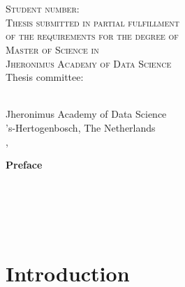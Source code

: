\documentclass[10pt, twoside, letterpaper]{report}
\begin{document}
\begin{titlepage}
\begin{center}
    \huge{\textbf{\longtitle}}\\[1.2cm]

    \normalsize{\fullname}\\
    \normalsize{\textsc{Student number}: \studentnumber}\\[1cm]

    \normalsize{\textsc{Thesis submitted in partial fulfillment}}\\
    \normalsize{\textsc{of the requirements for the degree of}}\\
    \normalsize{\textsc{Master of Science in \programme}}\\
    \normalsize{\textsc{Jheronimus Academy of Data Science}}\\[1.5cm]
    
    \normalsize{Thesis committee:}\\[0.2cm]
    \normalsize{\firstsupervisor}\\
    \normalsize{\secondsupervisor}

    \vfill

    \normalsize{Jheronimus Academy of Data Science}\\
    \normalsize{'s-Hertogenbosch, The Netherlands}\\
    \normalsize{\finalmonth, \finalyear}
\end{center}
\end{titlepage}
\newpage\thispagestyle{empty}\strut\newpage\thispagestyle{empty}

\textbf{Preface}



\newpage\thispagestyle{empty}\strut\newpage\thispagestyle{empty}

\tableofcontents
{}
\newpage\thispagestyle{empty}\strut\newpage\thispagestyle{empty}

\setcounter{page}{1}
\huge{\textbf{\longtitle}}\\[1cm]
\large{\fullname}\\[0.5cm]
\thispagestyle{empty}

\normalsize\textit{}\\[0.5cm]

{\let\clearpage\relax\chapter{Introduction}\thispagestyle{empty}}
\label{ch:introduction}

\end{document}
